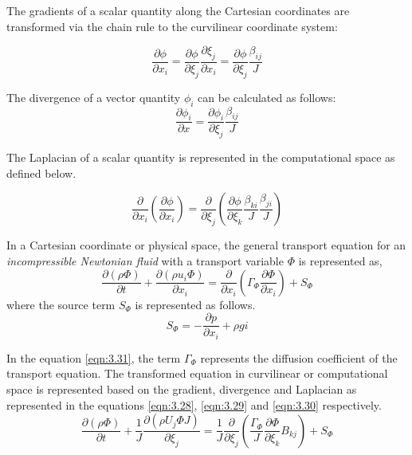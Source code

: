 The gradients of a scalar quantity along the Cartesian coordinates are transformed via the chain rule to the curvilinear coordinate system:

\begin{equation}
 \frac{\partial\phi}{\partial{x_{i}}} = \frac{\partial\phi}{\partial{\xi_j}}\frac{\partial{\xi_j}}{\partial{x_i}} = \frac{\partial\phi}{\partial{\xi_j}}\frac{\beta_{ij}}{J}
 \label{eqn:3.28}
\end{equation}

The divergence of a vector quantity $\phi_{i}$ can be calculated as follows:
\begin{equation}
\frac{\partial{\phi_i}}{\partial{x}} = \frac{\partial{\phi_{i}}}{\partial{\xi_{j}}}\frac{\beta_{ij}}{J}
\label{eqn:3.29}
\end{equation}

The Laplacian of a scalar quantity is represented in the computational space as defined below.

\begin{equation}
\frac{\partial}{\partial{x_i}}\left(\frac{\partial\phi}{\partial{x_i}}\right) = \frac{\partial}{\partial{\xi_j}}\left(\frac{\partial\phi}{\partial{\xi_k}}\frac{\beta_{ki}}{J}\frac{\beta_{ji}}{J}\right)
\label{eqn:3.30}
\end{equation}

In a Cartesian coordinate or physical space, the general transport equation for an \textit{incompressible Newtonian fluid} with a transport variable $\Phi$ is represented as,
\begin{equation}
\frac{\partial{\left(\rho\Phi\right)}}{\partial{t}}+\frac{\partial{\left({\rho}{u_i}\Phi\right)}}{\partial{x_i}} = \frac{\partial}{\partial{x_i}}\left(\Gamma_{\Phi}\frac{\partial{\Phi}}{\partial{x_i}}\right)+S_{\Phi}
\label{eqn:3.31}
\end{equation}
where the source term $S_{\Phi}$ is represented as follows.
\begin{equation}
S_{\Phi} = -\frac{\partial{p}}{\partial{x_i}}+{\rho}gi
\end{equation}

In the equation \ref{eqn:3.31}, the term $\Gamma_{\Phi}$ represents the diffusion coefficient of the transport equation. The transformed equation in curvilinear or computational space is represented based on the gradient, divergence and Laplacian as represented in the equations \ref{eqn:3.28}, \ref{eqn:3.29} and \ref{eqn:3.30} respectively. 
\begin{equation}
\frac{\partial{\left(\rho\Phi\right)}}{\partial{t}}+\frac{1}{J}\frac{\partial{\left({\rho}{U_j}{\Phi}J\right)}}{\partial{\xi_j}} = \frac{1}{J}\frac{\partial}{\partial{\xi_j}}\left(\frac{\Gamma_{\Phi}}{J}\frac{\partial{\Phi}}{\partial{\xi_k}}B_{kj}\right)+S_{\Phi}
\label{eqn3.33}
\end{equation}


